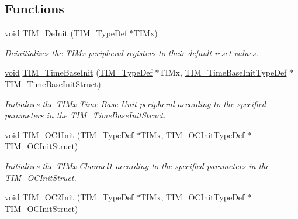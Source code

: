 \subsection*{Functions}
\begin{DoxyCompactItemize}
\item 
\hyperlink{usb__devapi_8h_afabf60e7f57651d6d595a02c75f07cd0}{void} \hyperlink{group___t_i_m___exported___functions_ga1659cc0ce503ac151568e0c7c02b1ba5}{T\+I\+M\+\_\+\+De\+Init} (\hyperlink{struct_t_i_m___type_def}{T\+I\+M\+\_\+\+Type\+Def} $\ast$T\+I\+Mx)
\begin{DoxyCompactList}\small\item\em Deinitializes the T\+I\+Mx peripheral registers to their default reset values. \end{DoxyCompactList}\item 
\hyperlink{usb__devapi_8h_afabf60e7f57651d6d595a02c75f07cd0}{void} \hyperlink{group___t_i_m___exported___functions_ga83fd58c9416802d9638bbe1715c98932}{T\+I\+M\+\_\+\+Time\+Base\+Init} (\hyperlink{struct_t_i_m___type_def}{T\+I\+M\+\_\+\+Type\+Def} $\ast$T\+I\+Mx, \hyperlink{struct_t_i_m___time_base_init_type_def}{T\+I\+M\+\_\+\+Time\+Base\+Init\+Type\+Def} $\ast$T\+I\+M\+\_\+\+Time\+Base\+Init\+Struct)
\begin{DoxyCompactList}\small\item\em Initializes the T\+I\+Mx Time Base Unit peripheral according to the specified parameters in the T\+I\+M\+\_\+\+Time\+Base\+Init\+Struct. \end{DoxyCompactList}\item 
\hyperlink{usb__devapi_8h_afabf60e7f57651d6d595a02c75f07cd0}{void} \hyperlink{group___t_i_m___exported___functions_gafcdb6ff00158862aef7fed5e7a554a3e}{T\+I\+M\+\_\+\+O\+C1\+Init} (\hyperlink{struct_t_i_m___type_def}{T\+I\+M\+\_\+\+Type\+Def} $\ast$T\+I\+Mx, \hyperlink{struct_t_i_m___o_c_init_type_def}{T\+I\+M\+\_\+\+O\+C\+Init\+Type\+Def} $\ast$T\+I\+M\+\_\+\+O\+C\+Init\+Struct)
\begin{DoxyCompactList}\small\item\em Initializes the T\+I\+Mx Channel1 according to the specified parameters in the T\+I\+M\+\_\+\+O\+C\+Init\+Struct. \end{DoxyCompactList}\item 
\hyperlink{usb__devapi_8h_afabf60e7f57651d6d595a02c75f07cd0}{void} \hyperlink{group___t_i_m___exported___functions_ga2017455121d910d6ff63ac6f219842c5}{T\+I\+M\+\_\+\+O\+C2\+Init} (\hyperlink{struct_t_i_m___type_def}{T\+I\+M\+\_\+\+Type\+Def} $\ast$T\+I\+Mx, \hyperlink{struct_t_i_m___o_c_init_type_def}{T\+I\+M\+\_\+\+O\+C\+Init\+Type\+Def} $\ast$T\+I\+M\+\_\+\+O\+C\+Init\+Struct)

\end{DoxyCompactItemize}
